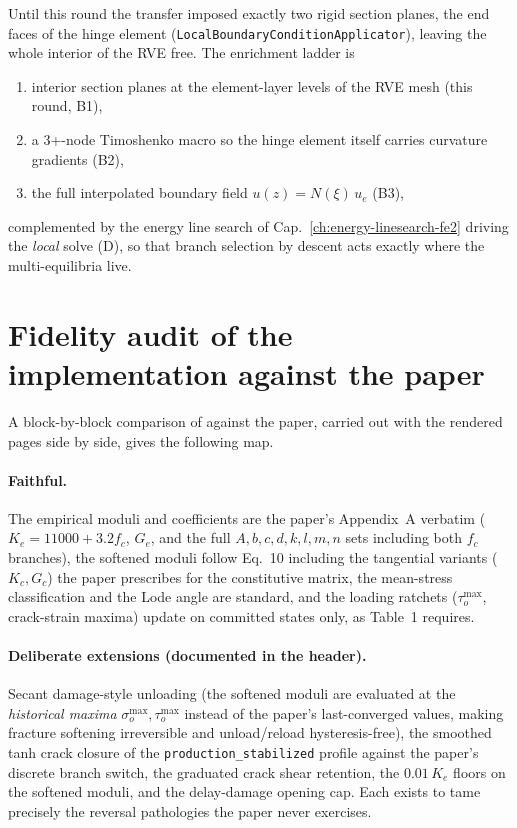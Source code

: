 Until this round the transfer imposed exactly two rigid section planes,
the end faces of the hinge element
(\texttt{LocalBoundaryConditionApplicator}), leaving the whole interior
of the RVE free. The enrichment ladder is
%
\begin{enumerate}
  \item interior section planes at the element-layer levels of the RVE
        mesh (this round, B1),
  \item a 3+-node Timoshenko macro so the hinge element itself carries
        curvature gradients (B2),
  \item the full interpolated boundary field $u(z) = N(\xi)\,u_e$ (B3),
\end{enumerate}
%
complemented by the energy line search of
Cap.~\ref{ch:energy-linesearch-fe2} driving the \emph{local} solve
(D), so that branch selection by descent acts exactly where the
multi-equilibria live.

\section{Fidelity audit of the implementation against the paper}
\label{sec:kb-audit}

A block-by-block comparison of
 against the paper,
carried out with the rendered pages side by side, gives the following
map.

\paragraph{Faithful.} The empirical moduli and coefficients are the
paper's Appendix~A verbatim ($K_e = 11000+3.2f_c$, $G_e$, and the full
$A,b,c,d,k,l,m,n$ sets including both $f_c$ branches), the softened
moduli follow Eq.~10 including the tangential variants
($K_c, G_c$) the paper prescribes for the constitutive matrix, the
mean-stress classification and the Lode angle are standard, and the
loading ratchets ($\tau_o^{\max}$, crack-strain maxima) update on
committed states only, as Table~1 requires.

\paragraph{Deliberate extensions (documented in the header).} Secant
damage-style unloading (the softened moduli are evaluated at the
\emph{historical maxima} $\sigma_o^{\max}, \tau_o^{\max}$ instead of the
paper's last-converged values, making fracture softening irreversible
and unload/reload hysteresis-free), the smoothed tanh crack closure of
the \texttt{production\_stabilized} profile against the paper's
discrete branch switch, the graduated crack shear retention, the
$0.01\,K_e$ floors on the softened moduli, and the delay-damage opening
cap. Each exists to tame precisely the reversal pathologies the paper
never exercises.

